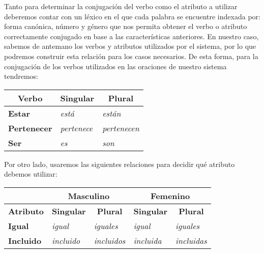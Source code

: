 Tanto para determinar la conjugación del verbo como el atributo a utilizar deberemos contar con un léxico en el que cada palabra se encuentre indexada por: forma canónica, número y género que nos permita obtener el verbo o atributo correctamente conjugado en base a las características anteriores. En nuestro caso, sabemos de antemano los verbos y atributos utilizados por el sistema, por lo que podremos construir esta relación para los casos necesarios. De esta forma, para la conjugación de los verbos utilizados en las oraciones de nuestro sistema tendremos:

\begin{table}[H]
\centering
\begin{tabular}{|l|l|l|}
\hline
\multicolumn{1}{|c|}{\textbf{Verbo}} & \multicolumn{1}{c|}{\textbf{Singular}} & \multicolumn{1}{c|}{\textbf{Plural}} \\ \hline
\textbf{Estar}                       & \textit{está}                                   & \textit{están}                                \\ \hline
\textbf{Pertenecer}                  & \textit{pertenece}                              & \textit{pertenecen}                           \\ \hline
\textbf{Ser}                         & \textit{es}                                     & \textit{son}                                  \\ \hline
\end{tabular}
\end{table}

\noindent
Por otro lado, usaremos las siguientes relaciones para decidir qué atributo debemos utilizar:

\begin{table}[H]
\centering
\begin{tabular}{l|l|l|l|l|}
\cline{2-5}
                                 & \multicolumn{2}{c|}{\textbf{Masculino}}                                       & \multicolumn{2}{c|}{\textbf{Femenino}}                                        \\ \hline
\multicolumn{1}{|c|}{\textbf{Atributo}} & \multicolumn{1}{c|}{\textbf{Singular}} & \multicolumn{1}{c|}{\textbf{Plural}} & \multicolumn{1}{c|}{\textbf{Singular}} & \multicolumn{1}{c|}{\textbf{Plural}} \\ \hline
\multicolumn{1}{|l|}{\textbf{Igual}}    & \textit{igual}                                  & \textit{iguales}                              & \textit{igual}                                  & \textit{iguales}                              \\ \hline
\multicolumn{1}{|l|}{\textbf{Incluido}} & \textit{incluido}                               & \textit{incluidos}                            & \textit{incluida}                               & \textit{incluidas}                            \\ \hline
\end{tabular}
\end{table}

